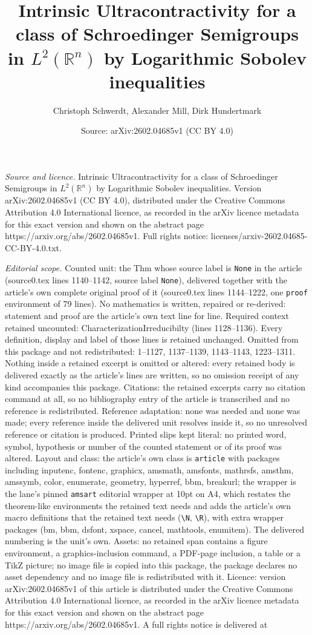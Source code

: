 \documentclass[10pt,a4paper]{amsart}
\title[Intrinsic Ultracontractivity for a class of Schroedinger Sem]{Intrinsic Ultracontractivity for a class of Schroedinger Semigroups in $L^{2}(\mathbb{R}^{n})$ by Logarithmic Sobolev inequalities}
\author{Christoph Schwerdt, Alexander Mill, Dirk Hundertmark}
\date{Source: arXiv:2602.04685v1 (CC BY 4.0)}
\begin{document}
\maketitle

\noindent\emph{Source and licence.} Intrinsic Ultracontractivity for a class of Schroedinger Semigroups in $L^{2}(\mathbb{R}^{n})$ by Logarithmic Sobolev inequalities. Version arXiv:2602.04685v1 (CC BY 4.0), distributed under the Creative Commons Attribution 4.0 International licence, as recorded in the arXiv licence metadata for this exact version and shown on the abstract page https://arxiv.org/abs/2602.04685v1. Full rights notice: licenses/arxiv-2602.04685-CC-BY-4.0.txt.\par\smallskip

\noindent\textit{Editorial scope.} Counted unit: the Thm whose source label is \texttt{None} in the article (source0.tex lines 1140--1142, source label \texttt{None}), delivered together with the article's own complete original proof of it (source0.tex lines 1144--1222, one \texttt{proof} environment of 79 lines). No mathematics is written, repaired or re-derived: statement and proof are the article's own text line for line. Required context retained uncounted: CharacterizationIrreducibilty (lines 1128--1136). Every definition, display and label of those lines is retained unchanged. Omitted from this package and not redistributed: 1--1127, 1137--1139, 1143--1143, 1223--1311. Nothing inside a retained excerpt is omitted or altered: every retained body is delivered exactly as the article's lines are written, so no omission receipt of any kind accompanies this package. Citations: the retained excerpts carry no citation command at all, so no bibliography entry of the article is transcribed and no reference is redistributed. Reference adaptation: none was needed and none was made; every reference inside the delivered unit resolves inside it, so no unresolved reference or citation is produced. Printed slips kept literal: no printed word, symbol, hypothesis or number of the counted statement or of its proof was altered. Layout and class: the article's own class is \texttt{article} with packages including inputenc, fontenc, graphicx, amsmath, amsfonts, mathrsfs, amsthm, amssymb, color, enumerate, geometry, hyperref, bbm, breakurl; the wrapper is the lane's pinned \texttt{amsart} editorial wrapper at 10pt on A4, which restates the theorem-like environments the retained text needs and adds the article's own macro definitions that the retained text needs (\texttt{\textbackslash N}, \texttt{\textbackslash R}), with extra wrapper packages (bm, bbm, dsfont, xspace, cancel, mathtools, enumitem). The delivered numbering is the unit's own. Assets: no retained span contains a figure environment, a graphics-inclusion command, a PDF-page inclusion, a table or a TikZ picture; no image file is copied into this package, the package declares no asset dependency and no image file is redistributed with it. Licence: version arXiv:2602.04685v1 of this article is distributed under the Creative Commons Attribution 4.0 International licence, as recorded in the arXiv licence metadata for this exact version and shown on the abstract page https://arxiv.org/abs/2602.04685v1. A full rights notice is delivered at 
\end{document}
